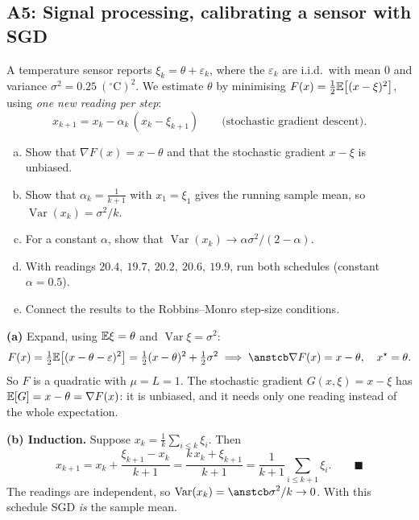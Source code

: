 \subsection{A5: Signal processing, calibrating a sensor with SGD}

\begin{frame}{}
  \begin{probbox}
    A temperature sensor reports $\xi_k = \theta + \varepsilon_k$, where the $\varepsilon_k$ are i.i.d.\ with mean $0$ and variance $\sigma^2 = 0.25\ (^\circ\text{C})^2$.
    We estimate $\theta$ by minimising $F(x) = \tfrac12\mathbb{E}\bigl[(x-\xi)^2\bigr]$, using \emph{one new reading per step}:
    \[
      x_{k+1} = x_k - \alpha_k\,(x_k - \xi_{k+1}) \qquad\text{(stochastic gradient descent)}.
    \]
    \vspace{-10pt}
    \begin{enumerate}[(a)]
      \item Show that $\nabla F(x) = x - \theta$ and that the stochastic gradient $x - \xi$ is unbiased.
      \item Show that $\alpha_k = \tfrac1{k+1}$ with $x_1 = \xi_1$ gives the running sample mean, so $\operatorname{Var}(x_k) = \sigma^2/k$.
      \item For a constant $\alpha$, show that $\operatorname{Var}(x_k) \to \alpha\sigma^2/(2-\alpha)$.
      \item With readings $20.4,\ 19.7,\ 20.2,\ 20.6,\ 19.9$, run both schedules (constant $\alpha = 0.5$).
      \item Connect the results to the Robbins--Monro step-size conditions.
    \end{enumerate}
  \end{probbox}
\end{frame}

\begin{frame}{}
  \textbf{(a)} Expand, using $\mathbb{E}\xi = \theta$ and $\operatorname{Var}\xi = \sigma^2$:
  \[
    F(x) = \tfrac12\E\bigl[(x - \theta - \varepsilon)^2\bigr] = \tfrac12(x-\theta)^2 + \tfrac12\sigma^2
    \;\Longrightarrow\; \ans{\nabla F(x) = x - \theta}, \quad x^\star = \theta .
  \]
  So $F$ is a quadratic with $\mu = L = 1$. The stochastic gradient $G(x,\xi) = x - \xi$ has
  $\mathbb{E}[G] = x - \theta = \nabla F(x)$: it is \alert{unbiased}, and it needs only one reading instead of the whole expectation.

  \vspace{4pt}
  \textbf{(b) Induction.} Suppose $x_k = \frac1k\sum_{i\le k}\xi_i$. Then
  \[
    x_{k+1} = x_k + \frac{\xi_{k+1} - x_k}{k+1} = \frac{k\,x_k + \xi_{k+1}}{k+1}
    = \frac{1}{k+1}\sum_{i\le k+1}\xi_i . \qquad\blacksquare
  \]
  The readings are independent, so $\operatorname{Var}(x_k) = \ans{\sigma^2/k} \to 0$. With this schedule SGD \emph{is} the sample mean.
\end{frame}

